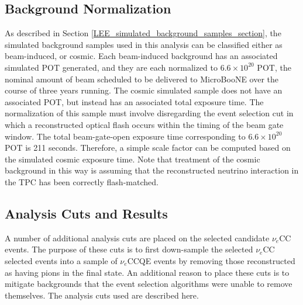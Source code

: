 \subsection{Background Normalization}\label{LEE_background_normalization_section}
As described in Section \ref{LEE_simulated_background_samples_section}, the simulated background samples used in this analysis can be classified either as beam-induced, or cosmic. Each beam-induced background has an associated simulated POT generated, and they are each normalized to $6.6\times10^{20}$ POT, the nominal amount of beam scheduled to be delivered to MicroBooNE over the course of three years running. The cosmic simulated sample does not have an associated POT, but instead has an associated total exposure time. The normalization of this sample must involve disregarding the event selection cut in which a reconstructed optical flash occurs within the timing of the beam gate window. The total beam-gate-open exposure time corresponding to $6.6\times10^{20}$ POT is 211 seconds. Therefore, a simple scale factor can be computed based on the simulated cosmic exposure time. Note that treatment of the cosmic background in this way is assuming that the reconstructed neutrino interaction in the TPC has been correctly flash-matched.


\subsection{Analysis Cuts and Results}\label{analysis_cut_descript_section}


A number of additional analysis cuts are placed on the selected candidate $\nu_e$CC events. The purpose of these cuts is to first down-sample the selected $\nu_e$CC selected events into a sample of $\nu_e$CCQE events by removing those reconstructed as having pions in the final state. An additional reason to place these cuts is to mitigate backgrounds that the event selection algorithms were unable to remove themselves. The analysis cuts used are described here.\\

